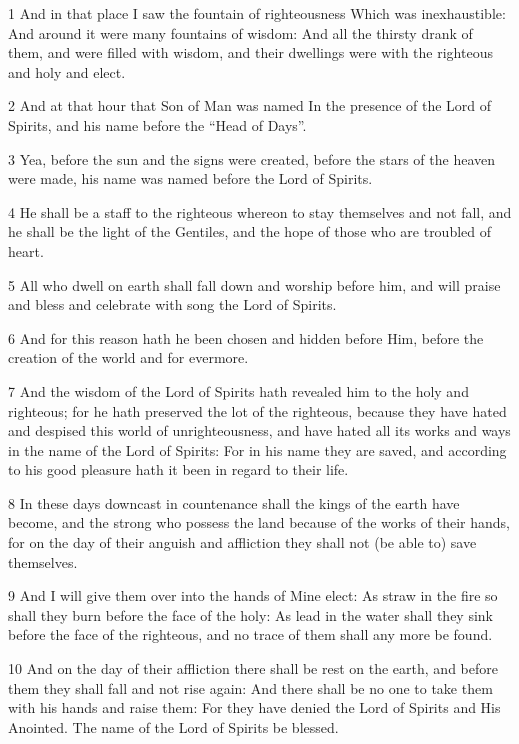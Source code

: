 \par 1 And in that place I saw the fountain of righteousness Which was inexhaustible: And around it were many fountains of wisdom: And all the thirsty drank of them, and were filled with wisdom, and their dwellings were with the righteous and holy and elect.
\par 2 And at that hour that Son of Man was named In the presence of the Lord of Spirits, and his name before the “Head of Days”.
\par 3 Yea, before the sun and the signs were created, before the stars of the heaven were made, his name was named before the Lord of Spirits.
\par 4 He shall be a staff to the righteous whereon to stay themselves and not fall, and he shall be the light of the Gentiles, and the hope of those who are troubled of heart.
\par 5 All who dwell on earth shall fall down and worship before him, and will praise and bless and celebrate with song the Lord of Spirits.
\par 6 And for this reason hath he been chosen and hidden before Him, before the creation of the world and for evermore.
\par 7 And the wisdom of the Lord of Spirits hath revealed him to the holy and righteous; for he hath preserved the lot of the righteous, because they have hated and despised this world of unrighteousness, and have hated all its works and ways in the name of the Lord of Spirits: For in his name they are saved, and according to his good pleasure hath it been in regard to their life.
\par 8 In these days downcast in countenance shall the kings of the earth have become, and the strong who possess the land because of the works of their hands, for on the day of their anguish and affliction they shall not (be able to) save themselves.
\par 9 And I will give them over into the hands of Mine elect: As straw in the fire so shall they burn before the face of the holy: As lead in the water shall they sink before the face of the righteous, and no trace of them shall any more be found.
\par 10 And on the day of their affliction there shall be rest on the earth, and before them they shall fall and not rise again: And there shall be no one to take them with his hands and raise them: For they have denied the Lord of Spirits and His Anointed. The name of the Lord of Spirits be blessed.

